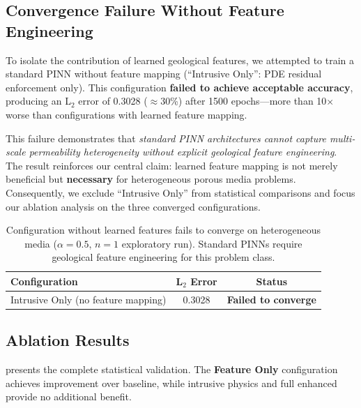 \documentclass[sn-mathphys]{sn-jnl}
\begin{document}
	\subsection{Convergence Failure Without Feature Engineering}
	\label{sec:convergence_failure}
	
	To isolate the contribution of learned geological features, we attempted to train a standard PINN without feature mapping (``Intrusive Only'': PDE residual enforcement only). This configuration \textbf{failed to achieve acceptable accuracy}, producing an L$_2$ error of 0.3028 ($\approx$30\%) after 1500 epochs---more than 10$\times$ worse than configurations with learned feature mapping.
	
	This failure demonstrates that \emph{standard PINN architectures cannot capture multi-scale permeability heterogeneity without explicit geological feature engineering}. The result reinforces our central claim: learned feature mapping is not merely beneficial but \textbf{necessary} for heterogeneous porous media problems. Consequently, we exclude ``Intrusive Only'' from statistical comparisons and focus our ablation analysis on the three converged configurations.
	
\begin{table}[!htbp]
	\centering
	\caption{Configuration without learned features fails to converge on 
		heterogeneous media ($\alpha=0.5$, $n=1$ exploratory run). 
		Standard PINNs require geological feature engineering for this problem class.}
	\label{tab:convergence_failure}
	\begin{tabular}{lcc}
		\toprule
		\textbf{Configuration} & \textbf{L$_2$ Error} & \textbf{Status} \\
		\midrule
		Intrusive Only (no feature mapping) & 0.3028 & \textbf{Failed to converge} \\
		\bottomrule
	\end{tabular}
\end{table}
	
	\subsection{Ablation Results}
	\label{sec:ablation_results}
	 presents the complete statistical validation. The \textbf{Feature Only} configuration achieves improvement over baseline, while intrusive physics and full enhanced provide no additional benefit.
	
\end{document}
